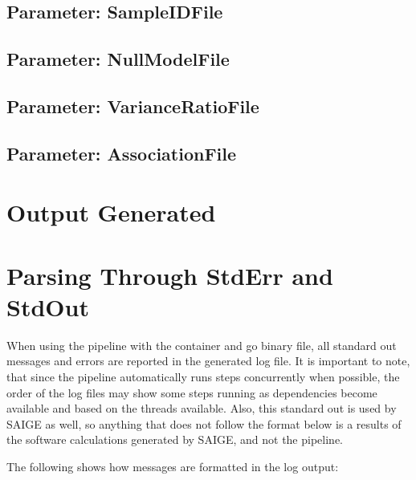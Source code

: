 \documentclass[letterpaper,10pt,english]{sphinxmanual}
\let\sphinxpxdimen\pdfpxdimen\else\newdimen\sphinxpxdimen
\begin{document}
\subsection{Parameter: SampleIDFile}
\label{\detokenize{fileFormats:parameter-sampleidfile}}

\subsection{Parameter: NullModelFile}
\label{\detokenize{fileFormats:parameter-nullmodelfile}}

\subsection{Parameter: VarianceRatioFile}
\label{\detokenize{fileFormats:parameter-varianceratiofile}}

\subsection{Parameter: AssociationFile}
\label{\detokenize{fileFormats:parameter-associationfile}}

\section{Output Generated}
\label{\detokenize{output:output-generated}}\label{\detokenize{output::doc}}

\section{Parsing Through StdErr and StdOut}
\label{\detokenize{parsingStdErrOut:parsing-through-stderr-and-stdout}}\label{\detokenize{parsingStdErrOut::doc}}
When using the pipeline with the container and go binary file, all standard out messages and errors are reported in the generated log file.  It is important to note, that since the pipeline automatically runs steps concurrently when possible, the order of the log files may show some steps running as dependencies become available and based on the threads available.  Also, this standard out is used by SAIGE as well, so anything that does not follow the format below is a results of the software calculations generated by SAIGE, and not the pipeline.

The following shows how messages are formatted in the log output:

\noindent\sphinxincludegraphics[width=800\sphinxpxdimen]{{messageFormat}.png}
\end{document}
